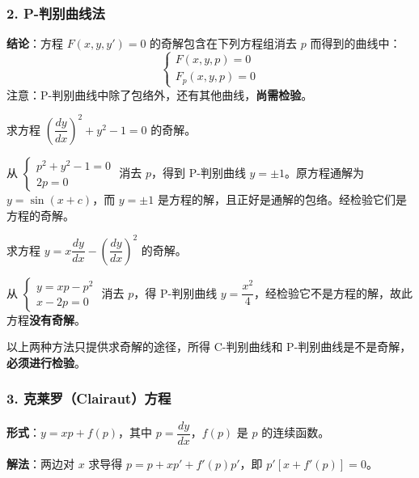\subsubsection{2. P-判别曲线法}

\textbf{结论}：方程 $F(x, y, y') = 0$ 的奇解包含在下列方程组消去 $p$ 而得到的曲线中：
$$\begin{cases} F(x, y, p) = 0 \\ F_p(x, y, p) = 0 \end{cases}$$
注意：P-判别曲线中除了包络外，还有其他曲线，\textbf{尚需检验}。

\begin{example}
求方程 $\left(\dfrac{dy}{dx}\right)^2 + y^2 - 1 = 0$ 的奇解。
\end{example}

\begin{solution}
从 $\begin{cases} p^2 + y^2 - 1 = 0 \\ 2p = 0 \end{cases}$ 消去 $p$，得到 P-判别曲线 $y = \pm 1$。原方程通解为 $y = \sin(x + c)$，而 $y = \pm 1$ 是方程的解，且正好是通解的包络。经检验它们是方程的奇解。
\end{solution}

\begin{example}
求方程 $y = x\dfrac{dy}{dx} - \left(\dfrac{dy}{dx}\right)^2$ 的奇解。
\end{example}

\begin{solution}
从 $\begin{cases} y = xp - p^2 \\ x - 2p = 0 \end{cases}$ 消去 $p$，得 P-判别曲线 $y = \dfrac{x^2}{4}$，经检验它不是方程的解，故此方程\textbf{没有奇解}。
\end{solution}

\begin{remark}
以上两种方法只提供求奇解的途径，所得 C-判别曲线和 P-判别曲线是不是奇解，\textbf{必须进行检验}。
\end{remark}

\subsubsection{3. 克莱罗（Clairaut）方程}

\textbf{形式}：$y = xp + f(p)$，其中 $p = \dfrac{dy}{dx}$，$f(p)$ 是 $p$ 的连续函数。

\textbf{解法}：两边对 $x$ 求导得 $p = p + xp' + f'(p)p'$，即 $p'[x + f'(p)] = 0$。

